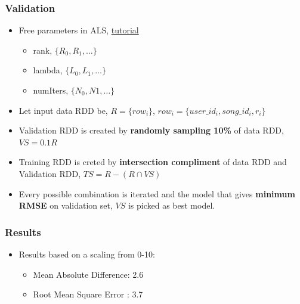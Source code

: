\documentclass[11pt]{beamer}
\begin{document}
\begin{frame}
  \frametitle{Validation}
  \begin{itemize}
    \item Free parameters in ALS, \href{'http://spark.apache.org/docs/latest/mllib-collaborative-filtering.html'}{tutorial}
      \begin{itemize}
        \item rank, $\{R_0,R_1,\dots\}$
        \item lambda, $\{L_0,L_1,\dots\}$
        \item numIters, $\{N_0,N1,\dots\}$
      \end{itemize}
    \item Let input data RDD be, $R = \{row_i\}$, $row_i = \{user\_id_i, song\_id_i, r_i\}$
    \item Validation RDD is created by {\bf randomly sampling 10\%} of data RDD, $VS = 0.1R$
      \item Training RDD is creted by {\bf intersection compliment} of data RDD and Validation RDD,
        $TS = R - (R \cap VS)$
      \item Every possible combination is iterated and the model that gives {\bf minimum RMSE} on
        validation set, $VS$ is picked as best model.
    \end{itemize}
  \end{frame}

  \begin{frame}
    \frametitle{Results}
    \begin{itemize}
      \item Results based on a scaling from 0-10: 
        \begin{itemize}
          \item Mean Absolute Difference: 2.6
          \item Root Mean Square Error  : 3.7
        \end{itemize}
    \end{itemize}
  \end{frame}
\end{document}

